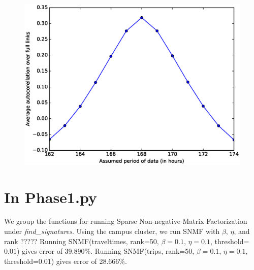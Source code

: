 \documentclass[12pt]{article}
\begin{document}
\begin{figure}[H]
\centering
\includegraphics[width=.9\textwidth]{Autocorrelation_Full_Links_hourly.ps}
\end{figure}

\section{In Phase1.py}
We group the functions for running Sparse Non-negative Matrix Factorization under \textsl{find\_signatures}.
Using the campus cluster, we run SNMF with $\beta$, $\eta$, and rank ?????
Running SNMF(traveltimes, rank=50, $\beta=0.1$, $\eta=0.1$, threshold=$0.01$) gives error of 39.890\%. 
Running SNMF(trips, rank=50, $\beta=0.1$, $\eta=0.1$, threshold=$0.01$) gives error of 28.666\%. 
\end{document}

